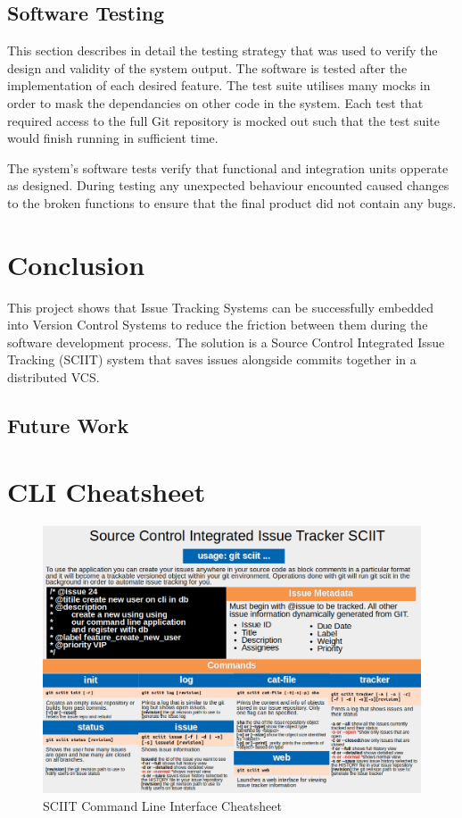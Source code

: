 \documentclass{mproj}
\begin{document}
\section{Software Testing} %

This section describes in detail the testing strategy that was used to verify the design and validity of the system output. The software is tested after the implementation of each desired feature. The test suite utilises many mocks in order to mask the dependancies on other code in the system. Each test that required access to the full Git repository is mocked out such that the test suite would finish running in sufficient time.


The system's software tests verify that functional and integration units opperate as designed. During testing any unexpected behaviour encounted caused changes to the broken functions to ensure that the final product did not contain any bugs.

\chapter{Conclusion}\label{conclusion}

This project shows that Issue Tracking Systems can be successfully embedded into Version Control Systems to reduce the friction between them during the software development process. The solution is a Source Control Integrated Issue Tracking (SCIIT) system that saves issues alongside commits together in a distributed VCS.

\section{Future Work}
\appendix %
\chapter{CLI Cheatsheet}
\begin{figure}[h!]
\caption{SCIIT Command Line Interface Cheatsheet}
\label{fig:sciit-cheatsheet}
\centering
\includegraphics[width=16cm]{Cheatsheet}
\end{figure}




\end{document}
